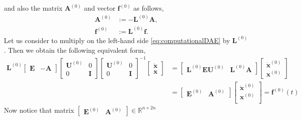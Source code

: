 		and also the matrix $\bm{A}^{(0)}$ and vector $\bm{f}^{(0)}$ as follows,
		\begin{subequations}
			\begin{align*}
				\bm{A}^{(0)} 	&:= -\bm{L}^{(0)}\bm{A},\\
				\bm{f}^{(0)} 	&:= \bm{L}^{(0)}\bm{f}.
			\end{align*}
		\end{subequations}
		Let us consider to multiply on the left-hand side 
		\cref{eq:computationalDAE} by $\bm{L}^{(0)}$.
		Then we obtain the following equivalent form,
		\begin{equation*}
			\begin{split}
				\bm{L}^{(0)}
				\begin{bmatrix}
					\bm{E} & -\bm{A} 
				\end{bmatrix}
				\begin{bmatrix}
					\bm{U}^{(0)} & 0 \\
					0 & \bm{I} 
				\end{bmatrix}
				\begin{bmatrix}
					\bm{U}^{(0)} & 0 \\
					0 & \bm{I} 
				\end{bmatrix}^{-1}
				\begin{bmatrix}
					\dot{\bm{x}} \\
					\bm{x}
				\end{bmatrix}
				&= 
				\begin{bmatrix}
					\bm{L}^{(0)}\bm{EU}^{(0)} & \bm{L}^{(0)}\bm{A}
				\end{bmatrix}
				\begin{bmatrix}
					\dot{\bm{x}}^{(0)}\\
					\bm{x}^{(0)}
				\end{bmatrix} \\
				&= 
				\begin{bmatrix}
					\bm{E}^{(0)} & \bm{A}^{(0)}
				\end{bmatrix}
				\begin{bmatrix}
					\dot{\bm{x}}^{(0)} \\
					\bm{x}^{(0)} \\
				\end{bmatrix}
				=
				\bm{f}^{(0)}(t)
			\end{split}
		\end{equation*}
		Now notice that matrix
		$\begin{bmatrix}\bm{E}^{(0)} & \bm{A}^{(0)}\end{bmatrix}\in\mathbb{R}^{n\times 2n}$
